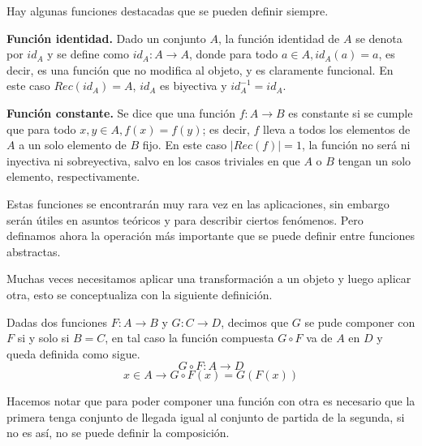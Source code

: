 Hay algunas funciones destacadas que se pueden definir siempre.

{\bf Función identidad.} Dado un conjunto $A$, la función identidad de $A$ se denota por $id_A$ y se define como $id_A:A\rightarrow A$, donde para todo $a\in A, id_A(a)=a$, es decir, es una función que no modifica al objeto, y es claramente funcional.
En este caso $Rec(id_A)=A$, $id_A$ es biyectiva y $id_A^{-1}=id_A$.

{\bf Función constante.} Se dice que una función $f:A\rightarrow B$ es constante si se cumple que para todo $x,y\in A, f(x)=f(y)$; es decir, $f$ lleva a todos los elementos de $A$ a un solo elemento de $B$ fijo.
En este caso $|Rec(f)|=1$, la función no será ni inyectiva ni sobreyectiva, salvo en los casos triviales en que $A$ o $B$ tengan un solo elemento, respectivamente.

Estas funciones se encontrarán muy rara vez en las aplicaciones, sin embargo serán útiles en asuntos teóricos y para describir ciertos fenómenos.
Pero definamos ahora la operación más importante que se puede definir entre funciones abstractas.

Muchas veces necesitamos aplicar una transformación a un objeto y luego aplicar otra, esto se conceptualiza con la siguiente definición.

\vspace{.2cm}

\begin{defn}
Dadas dos funciones $F:A\rightarrow B$ y $G:C\rightarrow D$, decimos que $G$ se pude componer con $F$ si y solo si $B=C$, en tal caso la función compuesta $G\circ F$ va de $A$ en $D$ y queda definida como sigue.
$$G\circ F:A\rightarrow D$$
$$x\in A\rightarrow G\circ F(x)=G(F(x))$$
\end{defn}

Hacemos notar que para poder componer una función con otra es necesario que la primera tenga conjunto de llegada igual al conjunto de partida de la segunda, si no es así, no se puede definir la composición.

\vspace{.2cm}

